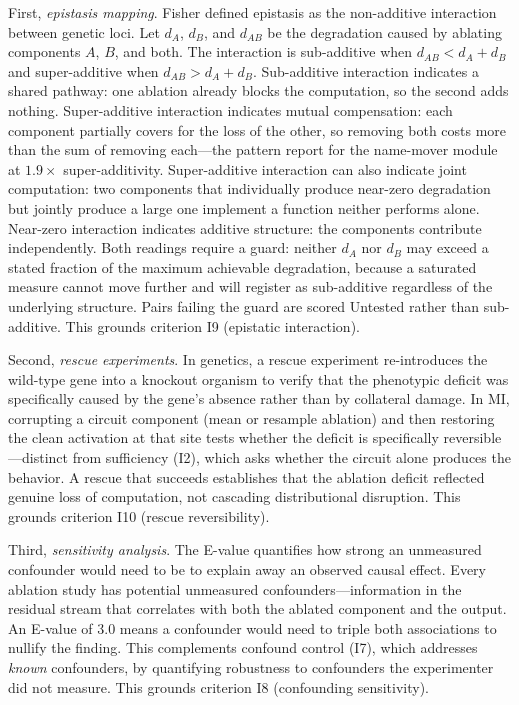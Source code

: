 \documentclass{article}
\begin{document}
First, \emph{epistasis mapping}. Fisher defined epistasis as the non-additive interaction between genetic loci. Let $d_A$, $d_B$, and $d_{AB}$ be the degradation caused by ablating components $A$, $B$, and both. The interaction is sub-additive when $d_{AB} < d_A + d_B$ and super-additive when $d_{AB} > d_A + d_B$. Sub-additive interaction indicates a shared pathway: one ablation already blocks the computation, so the second adds nothing. Super-additive interaction indicates mutual compensation: each component partially covers for the loss of the other, so removing both costs more than the sum of removing each---the pattern \citet{gong2026conditional} report for the name-mover module at $1.9\times$ super-additivity. Super-additive interaction can also indicate joint computation: two components that individually produce near-zero degradation but jointly produce a large one implement a function neither performs alone. Near-zero interaction indicates additive structure: the components contribute independently. Both readings require a guard: neither $d_A$ nor $d_B$ may exceed a stated fraction of the maximum achievable degradation, because a saturated measure cannot move further and will register as sub-additive regardless of the underlying structure. Pairs failing the guard are scored Untested rather than sub-additive. This grounds criterion I9 (epistatic interaction).

Second, \emph{rescue experiments}. In genetics, a rescue experiment re-introduces the wild-type gene into a knockout organism to verify that the phenotypic deficit was specifically caused by the gene's absence rather than by collateral damage. In MI, corrupting a circuit component (mean or resample ablation) and then restoring the clean activation at that site tests whether the deficit is specifically reversible---distinct from sufficiency (I2), which asks whether the circuit alone produces the behavior. A rescue that succeeds establishes that the ablation deficit reflected genuine loss of computation, not cascading distributional disruption. This grounds criterion I10 (rescue reversibility).

Third, \emph{sensitivity analysis}. The E-value quantifies how strong an unmeasured confounder would need to be to explain away an observed causal effect. Every ablation study has potential unmeasured confounders---information in the residual stream that correlates with both the ablated component and the output. An E-value of 3.0 means a confounder would need to triple both associations to nullify the finding. This complements confound control (I7), which addresses \emph{known} confounders, by quantifying robustness to confounders the experimenter did not measure. This grounds criterion I8 (confounding sensitivity).
\end{document}
